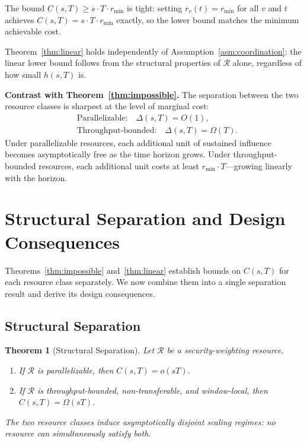 \documentclass[10pt,journal,compsoc]{IEEEtran}
\newtheorem{theorem}{Theorem}[section]
\theoremstyle{remark}
\begin{document}
	The bound $C(s,T) \geq s \cdot T \cdot r_{\min}$
	is tight: setting $r_v(t) = r_{\min}$ for all $v$
	and $t$ achieves $C(s,T) = s \cdot T \cdot r_{\min}$
	exactly, so the lower bound matches the minimum
	achievable cost.
	
	Theorem~\ref{thm:linear} holds independently of
	Assumption~\ref{asm:coordination}: the linear lower
	bound follows from the structural properties of
	$\mathcal{R}$ alone, regardless of how small $h(s,T)$ is.
	
	\medskip
	\noindent\textbf{Contrast with Theorem~\ref{thm:impossible}.}
	The separation between the two resource classes is
	sharpest at the level of marginal cost:
	\begin{align}
		&\text{Parallelizable:} \quad \Delta(s,T) = O(1), \nonumber \\
		&\text{Throughput-bounded:} \quad \Delta(s,T) = \Omega(T).
	\end{align}
	Under parallelizable resources, each additional unit
	of sustained influence becomes asymptotically free
	as the time horizon grows.
	Under throughput-bounded resources, each additional
	unit costs at least $r_{\min} \cdot T$---growing
	linearly with the horizon.
	
	\section{Structural Separation and Design Consequences}
	\label{sec:separation}
	
	Theorems~\ref{thm:impossible} and~\ref{thm:linear}
	establish bounds on $C(s,T)$ for each resource class
	separately.
	We now combine them into a single separation result
	and derive its design consequences.
	
	\subsection{Structural Separation}
	\label{ssec:separation_theorem}
	
	\begin{theorem}[Structural Separation]
		\label{thm:separation}
		Let $\mathcal{R}$ be a security-weighting resource.
		\begin{enumerate}
			\item If $\mathcal{R}$ is parallelizable, then
			$C(s,T) = o(sT)$.
			\item If $\mathcal{R}$ is throughput-bounded,
			non-transferable, and window-local, then
			$C(s,T) = \Omega(sT)$.
		\end{enumerate}
		The two resource classes induce asymptotically
		disjoint scaling regimes: no resource can
		simultaneously satisfy both.
	\end{theorem}
	
\end{document}
